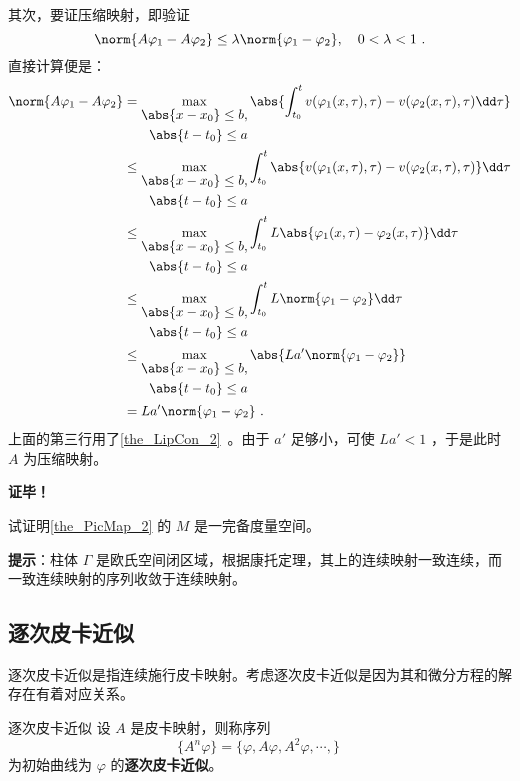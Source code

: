 其次，要证压缩映射，即验证 
\begin{equation}
\norm{A\varphi_1-A\varphi_2}\leq\lambda\norm{\varphi_1-\varphi_2},\quad 0<\lambda<1~.
\end{equation}
直接计算便是：
\begin{equation}
\begin{aligned}
\norm{A\varphi_1-A\varphi_2}&=\max_{\begin{aligned}\abs{x-x_0}\leq b,\\\abs{t-t_0}\leq a\end{aligned}}\abs{\int_{t_0}^t v(\varphi_1(x,\tau),\tau)-v(\varphi_2(x,\tau),\tau)\dd \tau}\\
&\leq\max_{\begin{aligned}\abs{x-x_0}\leq b,\\\abs{t-t_0}\leq a\end{aligned}}\int_{t_0}^t \abs{v(\varphi_1(x,\tau),\tau)-v(\varphi_2(x,\tau),\tau)}\dd \tau\\
&\leq \max_{\begin{aligned}\abs{x-x_0}\leq b,\\\abs{t-t_0}\leq a\end{aligned}}\int_{t_0}^t L\abs{\varphi_1(x,\tau)-\varphi_2(x,\tau)}\dd \tau\\
&\leq \max_{\begin{aligned}\abs{x-x_0}\leq b,\\\abs{t-t_0}\leq a\end{aligned}}\int_{t_0}^t L\norm{\varphi_1-\varphi_2}\dd \tau\\
&\leq\max_{\begin{aligned}\abs{x-x_0}\leq b,\\\abs{t-t_0}\leq a\end{aligned}}\abs{ La'\norm{\varphi_1-\varphi_2}}\\
&= La'\norm{\varphi_1-\varphi_2}~.
\end{aligned}
\end{equation}
上面的第三行用了\autoref{the_LipCon_2}~。由于 $a'$ 足够小，可使 $La'<1$ ，于是此时 $A$ 为压缩映射。

\textbf{证毕！}
\begin{definition}{}
试证明\autoref{the_PicMap_2} 的 $M$ 是一完备度量空间。
\end{definition}
\textbf{提示}：柱体 $\Gamma$ 是欧氏空间闭区域，根据康托定理，其上的连续映射一致连续，而一致连续映射的序列收敛于连续映射。
\subsection{逐次皮卡近似}
逐次皮卡近似是指连续施行皮卡映射。考虑逐次皮卡近似是因为其和微分方程的解存在有着对应关系。
\begin{definition}{逐次皮卡近似}
设 $A$ 是皮卡映射，则称序列
\begin{equation}
\{A^n\varphi\}=\{\varphi, A\varphi, A^2\varphi,\cdots,\}~ 
\end{equation}
为初始曲线为 $\varphi$ 的\textbf{逐次皮卡近似}。
\end{definition}

